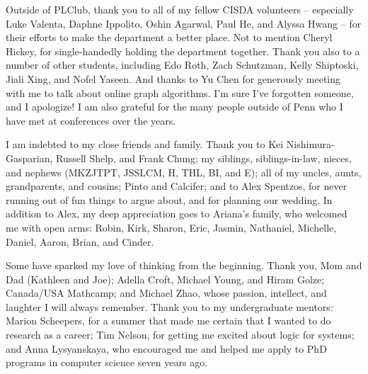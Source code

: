 Outside of PLClub, thank you to all of my fellow CISDA volunteers -- especially Luke Valenta, Daphne Ippolito, Oshin Agarwal, Paul He, and Alyssa Hwang -- for their efforts to make the department a better place.
Not to mention Cheryl Hickey, for single-handedly holding the department together.
Thank you also to a number of other students, including Edo Roth, Zach Schutzman, Kelly Shiptoski, Jiali Xing, and Nofel Yaseen.
And thanks to Yu Chen for generously meeting with me to talk about online graph algorithms.
I'm sure I've forgotten someone, and I apologize!
I am also grateful for the many people outside of Penn who I have met at conferences over the years.

I am indebted to my close friends and family. Thank you to Kei Nishimura-Gasparian, Russell Shelp, and Frank Chung; my siblings, siblings-in-law, nieces, and nephews (MKZJTPT, JSSLCM, H, THL, BI, and E); all of my uncles, aunts, grandparents, and cousins; Pinto and Calcifer; and to Alex Spentzos, for never running out of fun things to argue about, and for planning our wedding. In addition to Alex, my deep appreciation goes to Ariana's family, who welcomed me with open arms: Robin, Kirk, Sharon, Eric, Jasmin, Nathaniel, Michelle, Daniel, Aaron, Brian, and Cinder.

Some have sparked my love of thinking from the beginning.
Thank you, Mom and Dad (Kathleen and Joe);
Adella Croft, Michael Young, and Hiram Golze;
Canada/USA Mathcamp;
and Michael Zhao,
whose passion, intellect, and laughter I will always remember.
Thank you to my undergraduate mentors: Marion Scheepers, for a summer that made me certain that I wanted to do research as a career;
Tim Nelson, for getting me excited about logic for systems;
and Anna Lysyanskaya, who encouraged me and helped me apply to PhD programs in computer science seven years ago.
